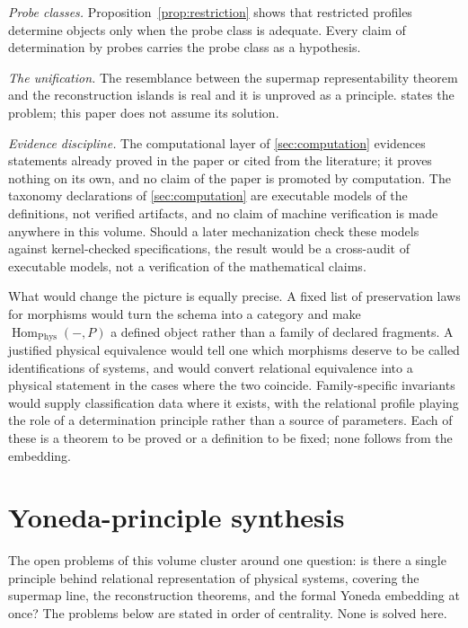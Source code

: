 \documentclass[11pt,letterpaper]{article}
\DeclareMathOperator{\Hom}{Hom}
\theoremstyle{definition}
\theoremstyle{remark}
\begin{document}
\emph{Probe classes.} Proposition~\ref{prop:restriction} shows that restricted profiles determine objects only when the probe class is adequate. Every claim of determination by probes carries the probe class as a hypothesis.

\emph{The unification.} The resemblance between the supermap representability theorem and the reconstruction islands is real and it is unproved as a principle.  states the problem; this paper does not assume its solution.

\emph{Evidence discipline.} The computational layer of \cref{sec:computation} evidences statements already proved in the paper or cited from the literature; it proves nothing on its own, and no claim of the paper is promoted by computation. The taxonomy declarations of \cref{sec:computation} are executable models of the definitions, not verified artifacts, and no claim of machine verification is made anywhere in this volume. Should a later mechanization check these models against kernel-checked specifications, the result would be a cross-audit of executable models, not a verification of the mathematical claims.

What would change the picture is equally precise. A fixed list of preservation laws for morphisms would turn the schema into a category and make $\Hom_{\mathrm{Phys}}(-, P)$ a defined object rather than a family of declared fragments. A justified physical equivalence would tell one which morphisms deserve to be called identifications of systems, and would convert relational equivalence into a physical statement in the cases where the two coincide. Family-specific invariants would supply classification data where it exists, with the relational profile playing the role of a determination principle rather than a source of parameters. Each of these is a theorem to be proved or a definition to be fixed; none follows from the embedding.

\section{Yoneda-principle synthesis}
\label{sec:synthesis}

The open problems of this volume cluster around one question: is there a single principle behind relational representation of physical systems, covering the supermap line, the reconstruction theorems, and the formal Yoneda embedding at once? The problems below are stated in order of centrality. None is solved here.
\end{document}
